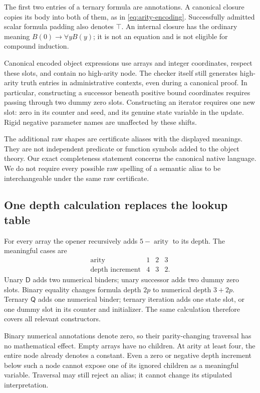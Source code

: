 \documentclass[11pt,letterpaper]{article}
\theoremstyle{definition}\newtheorem{definition}[theorem]{Definition}
\theoremstyle{remark}\newtheorem{remark}[theorem]{Remark}
\newcommand{\D}{\mathsf D}
\newcommand{\Q}{\mathsf Q}
\begin{document}
The first two entries of a ternary formula are annotations.  A canonical
closure copies its body into both of them, as in
\eqref{eq:arity-encoding}.  Successfully admitted scalar formula padding
also denotes $\top$.  An internal closure has the ordinary meaning
$B(0)\to\forall yB(y)$; it is not an equation and is not eligible for
compound induction.

Canonical encoded object expressions use arrays and integer coordinates,
respect these slots, and contain no high-arity node.  The checker itself
still generates high-arity truth entries in administrative contexts,
even during a canonical proof.  In particular, constructing a
successor beneath positive bound coordinates requires passing through
two dummy zero slots.  Constructing an iterator requires one new slot:
zero in its counter and seed, and its genuine state variable in the
update.  Rigid negative parameter names are unaffected by these shifts.

The additional raw shapes are certificate aliases with the displayed
meanings.  They are not independent predicate or function symbols added
to the object theory.  Our exact completeness statement concerns the
canonical native language.  We do not require every possible raw spelling
of a semantic alias to be interchangeable under the same raw certificate.

\subsection{One depth calculation replaces the lookup table}

For every array the opener recursively adds $5-\operatorname{arity}$
to its depth.  The meaningful cases are
\[
\begin{array}{c|ccc}
 \operatorname{arity}&1&2&3\\\hline
 \text{depth increment}&4&3&2.
\end{array}
\]
Unary $\D$ adds two numerical binders; unary successor adds two dummy
zero slots.  Binary equality changes formula depth $2p$ to numerical
depth $3+2p$.  Ternary $\Q$ adds one numerical binder; ternary iteration
adds one state slot, or one dummy slot in its counter and initializer.
The same calculation therefore covers all relevant constructors.

Binary numerical annotations denote zero, so their parity-changing
traversal has no mathematical effect.  Empty arrays have no children.
At arity at least four, the entire node already denotes a constant.
Even a zero or negative depth increment below such a node cannot expose
one of its ignored children as a meaningful variable.  Traversal may
still reject an alias; it cannot change its stipulated interpretation.
\end{document}
